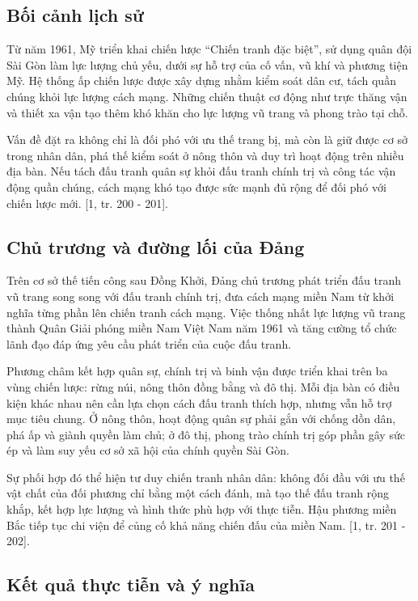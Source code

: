 \subsection{Bối cảnh lịch sử}

Từ năm 1961, Mỹ triển khai chiến lược “Chiến tranh đặc biệt”, sử dụng quân đội Sài Gòn làm lực lượng chủ yếu, dưới sự hỗ trợ của cố vấn, vũ khí và phương tiện Mỹ. Hệ thống ấp chiến lược được xây dựng nhằm kiểm soát dân cư, tách quần chúng khỏi lực lượng cách mạng. Những chiến thuật cơ động như trực thăng vận và thiết xa vận tạo thêm khó khăn cho lực lượng vũ trang và phong trào tại chỗ.

Vấn đề đặt ra không chỉ là đối phó với ưu thế trang bị, mà còn là giữ được cơ sở trong nhân dân, phá thế kiểm soát ở nông thôn và duy trì hoạt động trên nhiều địa bàn. Nếu tách đấu tranh quân sự khỏi đấu tranh chính trị và công tác vận động quần chúng, cách mạng khó tạo được sức mạnh đủ rộng để đối phó với chiến lược mới. [1, tr. 200 - 201].

\subsection{Chủ trương và đường lối của Đảng}

Trên cơ sở thế tiến công sau Đồng Khởi, Đảng chủ trương phát triển đấu tranh vũ trang song song với đấu tranh chính trị, đưa cách mạng miền Nam từ khởi nghĩa từng phần lên chiến tranh cách mạng. Việc thống nhất lực lượng vũ trang thành Quân Giải phóng miền Nam Việt Nam năm 1961 và tăng cường tổ chức lãnh đạo đáp ứng yêu cầu phát triển của cuộc đấu tranh.

Phương châm kết hợp quân sự, chính trị và binh vận được triển khai trên ba vùng chiến lược: rừng núi, nông thôn đồng bằng và đô thị. Mỗi địa bàn có điều kiện khác nhau nên cần lựa chọn cách đấu tranh thích hợp, nhưng vẫn hỗ trợ mục tiêu chung. Ở nông thôn, hoạt động quân sự phải gắn với chống dồn dân, phá ấp và giành quyền làm chủ; ở đô thị, phong trào chính trị góp phần gây sức ép và làm suy yếu cơ sở xã hội của chính quyền Sài Gòn.

Sự phối hợp đó thể hiện tư duy chiến tranh nhân dân: không đối đầu với ưu thế vật chất của đối phương chỉ bằng một cách đánh, mà tạo thế đấu tranh rộng khắp, kết hợp lực lượng và hình thức phù hợp với thực tiễn. Hậu phương miền Bắc tiếp tục chi viện để củng cố khả năng chiến đấu của miền Nam. [1, tr. 201 - 202].

\subsection{Kết quả thực tiễn và ý nghĩa}

